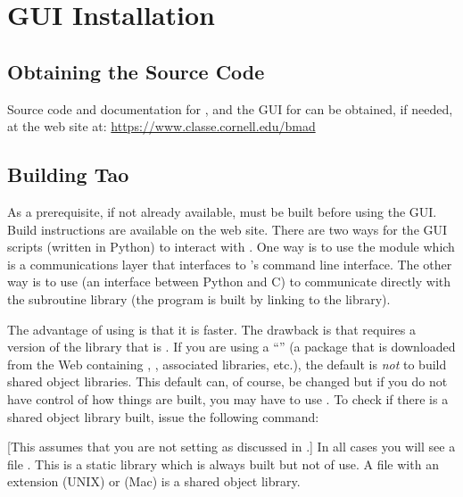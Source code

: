 \chapter{GUI Installation}
\label{s:gui.install}

\section{Obtaining the Source Code}

Source code and documentation for \bmad, \tao and the GUI for \tao can be obtained, if needed, at
the \bmad web site at:
  \hfill\break \hspace*{0.3in} \url{https://www.classe.cornell.edu/bmad}

\section{Building Tao}
\label{s:building}

As a prerequisite, if not already available, \tao must be built before using the GUI. Build
instructions are available on the \bmad web site. There are two ways for the GUI scripts (written in
Python) to interact with \tao. One way is to use the  module which is a communications
layer that interfaces to \tao's command line interface. The other way is to use  (an
interface between Python and C) to communicate directly with the \tao subroutine library (the \tao
program is built by linking to the \tao library). 

The advantage of using  is that it is faster. The drawback is that  requires a
version of the \tao library that is . If you are using a \bmad
``'' (a package that is downloaded from the Web containing \bmad, \tao, associated
libraries, etc.), the default is {\em not} to build shared object libraries. This default can, of
course, be changed but if you do not have control of how things are built, you may have to use
. To check if there is a shared object library built, issue the following command:
[This assumes that you are not setting  as discussed in .]
In all cases you will see a file . This is a static library which is always built but
not of use. A file with an extension  (UNIX) or  (Mac) is a shared object library. 


